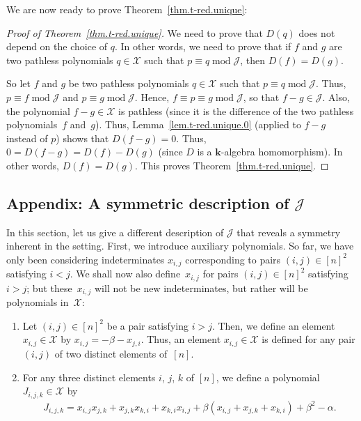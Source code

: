\documentclass[pdftex]{sigma}
\numberwithin{equation}{section}
\begin{document}
We are now ready to prove Theorem~\ref{thm.t-red.unique}:

\begin{proof}[Proof of Theorem~\ref{thm.t-red.unique}]We need to prove that $D ( q) $ does not depend on the choice of $q$. In other words, we need to prove that if $f$ and $g$ are two pathless polynomials $q\in\mathcal{X}$ such that $p\equiv q\operatorname{mod}\mathcal{J}$, then $D(f) =D(g) $.

So let $f$ and $g$ be two pathless polynomials $q\in\mathcal{X}$ such that $p\equiv q\operatorname{mod}\mathcal{J}$. Thus, $p\equiv f\operatorname{mod} \mathcal{J}$ and $p\equiv g\operatorname{mod}\mathcal{J}$. Hence, $f\equiv p\equiv g\operatorname{mod}\mathcal{J}$, so that $f-g\in\mathcal{J}$. Also, the polynomial $f-g\in\mathcal{X}$ is pathless (since it is the difference of the two pathless polynomials~$f$ and~$g$). Thus, Lemma~\ref{lem.t-red.unique.0} (applied to $f-g$ instead of $p$) shows that $D(f-g) =0$. Thus, $0=D(f-g) =D(f) -D(g) $ (since $D$ is a $\mathbf{k}$-algebra homomorphism). In other words, $D(f) =D(g) $. This proves
Theorem~\ref{thm.t-red.unique}.
\end{proof}

\subsection[Appendix: A symmetric description of $\mathcal{J}$]{Appendix: A symmetric description of $\boldsymbol{\mathcal{J}}$}\label{sect.symmetry}

In this section, let us give a different description of $\mathcal{J}$ that reveals a symmetry inherent in the setting. First, we introduce auxiliary polynomials. So far, we have only been considering indeterminates $x_{i,j}$
corresponding to pairs $(i,j) \in[n] ^{2}$ satisfying $i<j$. We shall now also define~$x_{i,j}$ for pairs $ (i,j) \in[n] ^{2}$ satisfying $i>j$; but these~$x_{i,j}$ will not be new indeterminates, but rather will be polynomials in~$\mathcal{X}$:

\begin{Definition}\label{def.symmetry.xji}\quad\begin{enumerate}\itemsep=0pt
\item[(a)] Let $(i,j) \in [ n] ^{2}$ be a pair satisfying $i>j$. Then, we define an element $x_{i,j}\in\mathcal{X}$ by $x_{i,j}=-\beta-x_{j,i}$.
Thus, an element $x_{i,j}\in\mathcal{X}$ is defined for any pair $ (i,j) $ of two distinct elements of~$[n]$.
\item[(b)] For any three distinct elements $i$, $j$, $k$ of $[n] $, we define a polynomial $J_{i,j,k}\in\mathcal{X}$ by
\begin{gather*}
J_{i,j,k}=x_{i,j}x_{j,k}+x_{j,k}x_{k,i}+x_{k,i}x_{i,j}+\beta ( x_{i,j}+x_{j,k}+x_{k,i}) +\beta^{2}-\alpha.
\end{gather*}
\end{enumerate}
\end{Definition}
\end{document}
